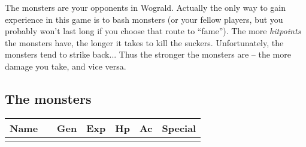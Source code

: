 \documentclass[11pt, a4paper]{article}
\begin{document}
The monsters are your opponents in Wograld.  Actually the only way
to gain experience in this game is to bash monsters (or your fellow
players, but you probably won't last long if you choose that route to
``fame'').  The more {\it hitpoints} the monsters have, the longer it
takes to kill the suckers.  Unfortunately, the monsters tend to strike
back...  Thus the stronger the monsters are -- the more damage you
take, and vice versa.

{\small 
\subsection*{The monsters}
\begin{longtable}{|p{2cm}|c|c|r|r|r|p{5cm}|}
\hline
Name&&Gen&Exp&Hp&Ac&Special\\
\hline
\hline
\endhead
\hline
\endfoot

\end{longtable}
}
\end{document}
